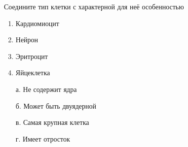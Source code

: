
Соедините
тип клетки с характерной для неё особенностью

\begin{multicols}{2}
    {
        \begin{enumerate}
            \item Кардиомиоцит
            \item Нейрон
            \item Эритроцит
            \item Яйцеклетка
        \end{enumerate}
    }
    {
        \begin{enumerate}
            \item[а.] Не содержит ядра
            \item[б.] Может быть двуядерной
            \item[в.] Самая крупная клетка
            \item[г.] Имеет отросток
        \end{enumerate}
    }
\end{multicols}


\explanationSection

